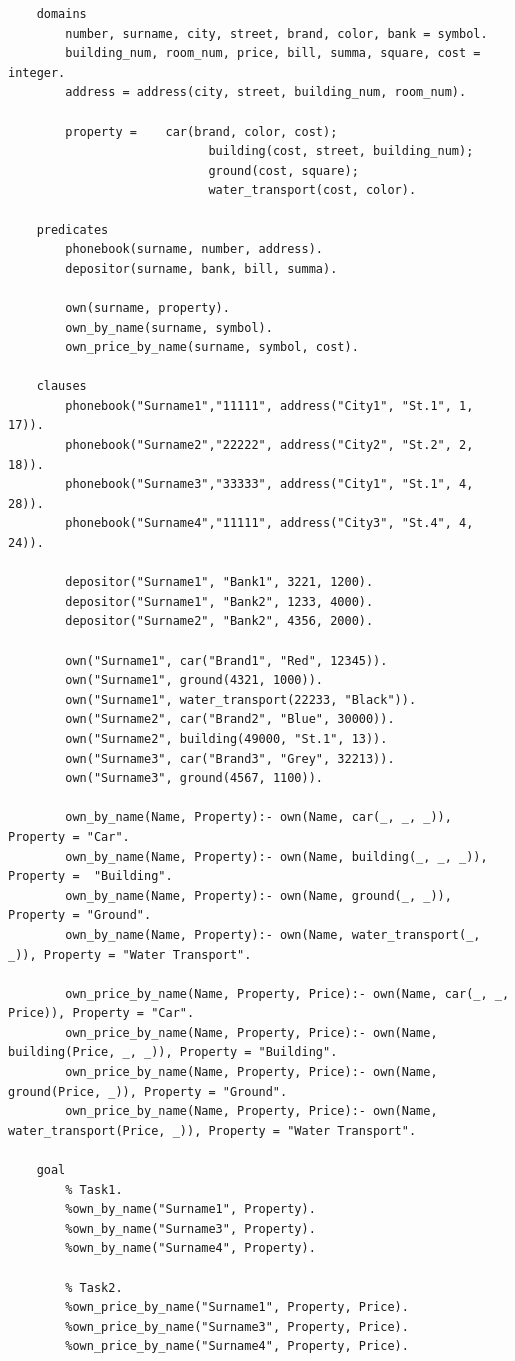\documentclass[12pt, a4paper]{extarticle}
\begin{document}
	\begin{lstlisting}
	domains
		number, surname, city, street, brand, color, bank = symbol.
		building_num, room_num, price, bill, summa, square, cost = integer.
		address = address(city, street, building_num, room_num).
	
		property = 	  car(brand, color, cost);
							building(cost, street, building_num);
							ground(cost, square);
							water_transport(cost, color).
	
	predicates
		phonebook(surname, number, address).
		depositor(surname, bank, bill, summa).
	
		own(surname, property).
		own_by_name(surname, symbol).
		own_price_by_name(surname, symbol, cost).
		
	clauses
		phonebook("Surname1","11111", address("City1", "St.1", 1, 17)).
		phonebook("Surname2","22222", address("City2", "St.2", 2, 18)).
		phonebook("Surname3","33333", address("City1", "St.1", 4, 28)).
		phonebook("Surname4","11111", address("City3", "St.4", 4, 24)).
		
		depositor("Surname1", "Bank1", 3221, 1200).
		depositor("Surname1", "Bank2", 1233, 4000).
		depositor("Surname2", "Bank2", 4356, 2000).
		
		own("Surname1", car("Brand1", "Red", 12345)).
		own("Surname1", ground(4321, 1000)).
		own("Surname1", water_transport(22233, "Black")).
		own("Surname2", car("Brand2", "Blue", 30000)).
		own("Surname2", building(49000, "St.1", 13)).
		own("Surname3", car("Brand3", "Grey", 32213)).
		own("Surname3", ground(4567, 1100)).
		
		own_by_name(Name, Property):- own(Name, car(_, _, _)), Property = "Car".
		own_by_name(Name, Property):- own(Name, building(_, _, _)), Property = 	"Building".
		own_by_name(Name, Property):- own(Name, ground(_, _)), Property = "Ground".
		own_by_name(Name, Property):- own(Name, water_transport(_, _)), Property = "Water Transport".
		
		own_price_by_name(Name, Property, Price):- own(Name, car(_, _, Price)), Property = "Car".
		own_price_by_name(Name, Property, Price):- own(Name, building(Price, _, _)), Property = "Building".
		own_price_by_name(Name, Property, Price):- own(Name, ground(Price, _)), Property = "Ground".
		own_price_by_name(Name, Property, Price):- own(Name, water_transport(Price, _)), Property = "Water Transport".
	
	goal
		% Task1.
		%own_by_name("Surname1", Property).
		%own_by_name("Surname3", Property).
		%own_by_name("Surname4", Property).
		
		% Task2.	
		%own_price_by_name("Surname1", Property, Price).
		%own_price_by_name("Surname3", Property, Price).
		%own_price_by_name("Surname4", Property, Price).
	
\end{lstlisting}
\newpage
\end{document}
